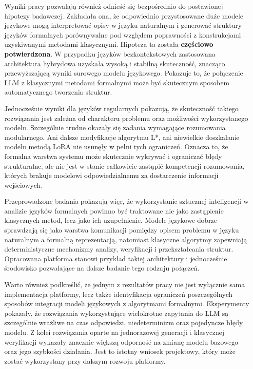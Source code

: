 \documentclass[12pt]{article}
\begin{document}
Wyniki pracy pozwalają również odnieść się bezpośrednio do postawionej hipotezy badawczej. Zakładała ona, że odpowiednio przystosowane duże modele językowe mogą interpretować opisy w języku naturalnym i generować struktury języków formalnych porównywalne pod względem poprawności z konstrukcjami uzyskiwanymi metodami klasycznymi. Hipoteza ta została \textbf{częściowo potwierdzona}. W przypadku języków bezkontekstowych zastosowana architektura hybrydowa uzyskała wysoką i stabilną skuteczność, znacząco przewyższającą wyniki surowego modelu językowego. Pokazuje to, że połączenie LLM z klasycznymi metodami formalnymi może być skutecznym sposobem automatycznego tworzenia struktur.

Jednocześnie wyniki dla języków regularnych pokazują, że skuteczność takiego rozwiązania jest zależna od charakteru problemu oraz możliwości wykorzystanego modelu. Szczególnie trudne okazały się zadania wymagające rozumowania modularnego. Ani dalsze modyfikacje algorytmu L*, ani niewielkie doszkalanie modelu metodą LoRA nie usunęły w pełni tych ograniczeń. Oznacza to, że formalna warstwa systemu może skutecznie wykrywać i ograniczać błędy strukturalne, ale nie jest w stanie całkowicie zastąpić kompetencji rozumowania, których brakuje modelowi odpowiedzialnemu za dostarczenie informacji wejściowych.

Przeprowadzone badania pokazują więc, że wykorzystanie sztucznej inteligencji w analizie języków formalnych powinno być traktowane nie jako zastąpienie klasycznych metod, lecz jako ich uzupełnienie. Modele językowe dobrze sprawdzają się jako warstwa komunikacji pomiędzy opisem problemu w języku naturalnym a formalną reprezentacją, natomiast klasyczne algorytmy zapewniają deterministyczne mechanizmy analizy, weryfikacji i przekształcania struktur. Opracowana platforma stanowi przykład takiej architektury i jednocześnie środowisko pozwalające na dalsze badanie tego rodzaju połączeń.

Warto również podkreślić, że jednym z rezultatów pracy nie jest wyłącznie sama implementacja platformy, lecz także identyfikacja ograniczeń poszczególnych sposobów integracji modeli językowych z algorytmami formalnymi. Eksperymenty pokazały, że rozwiązania wykorzystujące wielokrotne zapytania do LLM są szczególnie wrażliwe na czas odpowiedzi, niedeterminizm oraz pojedyncze błędy modelu. Z kolei rozwiązania oparte na jednorazowej generacji i klasycznej weryfikacji wykazały znacznie większą odporność na zmianę modelu bazowego oraz jego szybkości działania. Jest to istotny wniosek projektowy, który może zostać wykorzystany przy dalszym rozwoju platformy.
\end{document}
